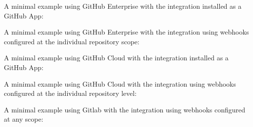 \pagebreak
A minimal example using GitHub Enterprise with the \cxoneflow integration installed
as a GitHub App:

  
  
\pagebreak
A minimal example using GitHub Enterprise with the \cxoneflow integration using
webhooks configured at the individual repository scope:





\pagebreak
A minimal example using GitHub Cloud with the \cxoneflow integration installed
as a GitHub App:


  
  
\pagebreak
A minimal example using GitHub Cloud with the \cxoneflow integration using
webhooks configured at the individual repository level:


\pagebreak
A minimal example using Gitlab with the \cxoneflow integration using
webhooks configured at any scope:

